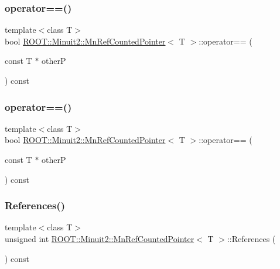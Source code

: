 \subsubsection{\texorpdfstring{operator==()}{operator==()}\hspace{0.1cm}{\footnotesize\ttfamily [1/2]}}
{\footnotesize\ttfamily template$<$class T$>$ \\
bool \mbox{\hyperlink{classROOT_1_1Minuit2_1_1MnRefCountedPointer}{R\+O\+O\+T\+::\+Minuit2\+::\+Mn\+Ref\+Counted\+Pointer}}$<$ T $>$\+::operator== (\begin{DoxyParamCaption}\item[{const T $\ast$}]{otherP }\end{DoxyParamCaption}) const\hspace{0.3cm}{\ttfamily [inline]}}

\mbox{\label{classROOT_1_1Minuit2_1_1MnRefCountedPointer_a2dbec0c22ef3492abc24cdaa885fd26e}} 
\subsubsection{\texorpdfstring{operator==()}{operator==()}\hspace{0.1cm}{\footnotesize\ttfamily [2/2]}}
{\footnotesize\ttfamily template$<$class T$>$ \\
bool \mbox{\hyperlink{classROOT_1_1Minuit2_1_1MnRefCountedPointer}{R\+O\+O\+T\+::\+Minuit2\+::\+Mn\+Ref\+Counted\+Pointer}}$<$ T $>$\+::operator== (\begin{DoxyParamCaption}\item[{const T $\ast$}]{otherP }\end{DoxyParamCaption}) const\hspace{0.3cm}{\ttfamily [inline]}}

\mbox{\label{classROOT_1_1Minuit2_1_1MnRefCountedPointer_acffac58848d817d7747631954daf3e0c}} 
\subsubsection{\texorpdfstring{References()}{References()}\hspace{0.1cm}{\footnotesize\ttfamily [1/2]}}
{\footnotesize\ttfamily template$<$class T$>$ \\
unsigned int \mbox{\hyperlink{classROOT_1_1Minuit2_1_1MnRefCountedPointer}{R\+O\+O\+T\+::\+Minuit2\+::\+Mn\+Ref\+Counted\+Pointer}}$<$ T $>$\+::References (\begin{DoxyParamCaption}{ }\end{DoxyParamCaption}) const\hspace{0.3cm}{\ttfamily [inline]}}

